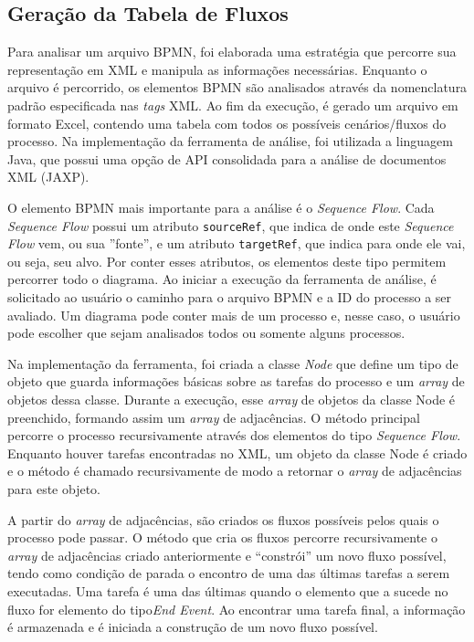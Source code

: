 \documentclass[12pt]{article}
\begin{document}

\subsection{Geração da Tabela de Fluxos}

Para analisar um arquivo BPMN, foi elaborada uma estratégia que percorre sua representação em XML e manipula as informações necessárias. Enquanto o arquivo é percorrido, os elementos BPMN são analisados através da nomenclatura padrão especificada nas \emph{tags} XML. Ao fim da execução, é gerado um arquivo em formato Excel, contendo uma tabela com todos os possíveis cenários/fluxos do processo. Na implementação da ferramenta de análise, foi utilizada a linguagem Java, que possui uma opção de API consolidada para a análise de documentos XML (JAXP).

O elemento BPMN mais importante para a análise é o \emph{Sequence Flow}. Cada \emph{Sequence Flow} possui um atributo \texttt{sourceRef}, que indica de onde este \emph{Sequence Flow} vem, ou sua ''fonte'', e um atributo \texttt{targetRef}, que indica para onde ele vai, ou seja, seu alvo. Por conter esses atributos, os elementos deste tipo permitem percorrer todo o diagrama. Ao iniciar a execução da ferramenta de análise, é solicitado ao usuário o caminho para o arquivo BPMN e a ID do processo a ser avaliado. Um diagrama pode conter mais de um processo e, nesse caso, o usuário pode escolher que sejam analisados todos ou somente alguns processos.

Na implementação da ferramenta, foi criada a classe \emph{Node} que define um tipo de objeto que guarda informações básicas sobre as tarefas do processo e um \emph{array} de objetos dessa classe. Durante a execução, esse \emph{array} de objetos da classe Node é preenchido, formando assim um \emph{array} de adjacências. O método principal percorre o processo recursivamente através dos elementos do tipo \emph{Sequence Flow}. Enquanto houver tarefas encontradas no XML, um objeto da classe Node é criado e o método é chamado recursivamente de modo a retornar o \emph{array} de adjacências para este objeto.

A partir do \emph{array} de adjacências, são criados os fluxos possíveis pelos quais o processo pode passar. O método que cria os fluxos percorre recursivamente o \emph{array} de adjacências criado anteriormente e ``constrói'' um novo fluxo possível, tendo como condição de parada o encontro de uma das últimas tarefas a serem executadas. Uma tarefa é uma das últimas quando o elemento que a sucede no fluxo for elemento do tipo\emph{End Event}. Ao encontrar uma tarefa final, a informação é armazenada e é iniciada a construção de um novo fluxo possível.
\end{document}
